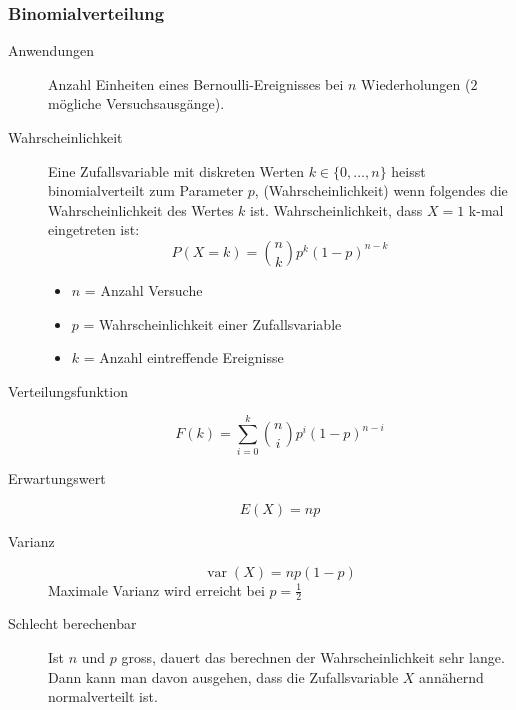 \subsubsection{Binomialverteilung}
\begin{description}
  \item[Anwendungen] Anzahl Einheiten eines Bernoulli-Ereignisses bei
    $n$ Wiederholungen ($2$ mögliche Versuchsausgänge).
  \item[Wahrscheinlichkeit] Eine Zufallsvariable mit diskreten Werten
    $k \in \{0, \dots, n\}$ heisst binomialverteilt zum Parameter $p$,
    (Wahrscheinlichkeit) wenn folgendes die Wahrscheinlichkeit des
    Wertes $k$ ist. Wahrscheinlichkeit, dass $X = 1$ k-mal eingetreten
    ist:
    \[P(X = k) = \binom{n}{k} p^k(1-p)^{n-k}\]
    \begin{itemize}
      \item $n$ = Anzahl Versuche
      \item $p$ = Wahrscheinlichkeit einer Zufallsvariable
      \item $k$ = Anzahl eintreffende Ereignisse
    \end{itemize}
  \item[Verteilungsfunktion] \[F(k) = \sum_{i=0}^k \binom{n}{i} p^i(1-p)^{n-i}\]
  \item[Erwartungswert] \[E(X) = np\]
  \item[Varianz] \[\operatorname{var}(X) = np(1-p)\]
    Maximale Varianz wird erreicht bei $p = \frac{1}{2}$
  \item[Schlecht berechenbar] Ist $n$ und $p$ gross, dauert das
  berechnen der Wahrscheinlichkeit sehr lange. Dann kann man davon
  ausgehen, dass die Zufallsvariable $X$ annähernd normalverteilt ist.
\end{description}


